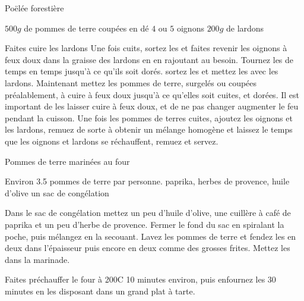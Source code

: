 \begin{recette}{Poëlée forestière}
\begin{ingredients}
\ingredient $500\unit{g}$ de pommes de terre coupées en dé
\ingredient $4$ ou $5$ oignons
\ingredient $200\unit{g}$ de lardons
\end{ingredients}

\begin{preparation}
\etape Faites cuire les lardons
\etape Une fois cuits, sortez les et faites revenir les oignons à feux doux dans la graisse des lardons en en rajoutant au besoin. Tournez les de temps en temps jusqu'à ce qu'ils soit dorés.
\etape sortez les et mettez les avec les lardons. Maintenant mettez les pommes de terre, surgelés ou coupées préalablement, à cuire à feux doux jusqu'à ce qu'elles soit cuites, et dorées. Il est important de les laisser cuire à feux doux, et de ne pas changer augmenter le feu pendant la cuisson.
\etape Une fois les pommes de terres cuites, ajoutez les oignons et les lardons, remuez de sorte à obtenir un mélange homogène et laissez le temps que les oignons et lardons se réchauffent, remuez et servez.
\end{preparation}

\end{recette}

\begin{recette}{Pommes de terre marinées au four}
\begin{ingredients}
\ingredient Environ 3.5 pommes de terre par personne.
\ingredient paprika, herbes de provence, huile d'olive
\ingredient un sac de congélation
\end{ingredients}

\begin{preparation}
\etape Dans le sac de congélation mettez un peu d'huile d'olive, une cuillère à café de paprika et un peu d'herbe de provence. Fermer le fond du sac en spiralant la poche, puis mélangez en la secouant.
\etape Lavez les pommes de terre et fendez les en deux dans l'épaisseur puis encore en deux comme des grosses frites.
\etape Mettez les dans la marinade.
\end{preparation}

\begin{cuisson}
Faites préchauffer le four à 200\degres C 10 minutes environ, puis enfournez les 30 minutes en les disposant dans un grand plat à tarte.
\end{cuisson}
\end{recette}

